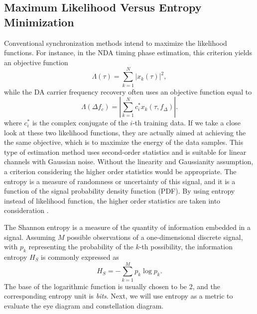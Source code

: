 \documentclass[journal,comsoc]{IEEEtran}
\begin{document}
\subsection{Maximum Likelihood Versus Entropy Minimization}
Conventional synchronization methods intend to maximize the likelihood functions.
For instance, in the NDA timing phase estimation, this criterion yields an objective function
\begin{equation}
\Lambda(\tau) =\sum\limits_{k = 1}^N {{{\left| {{x_k}( \tau )} \right|}^2}}, 
\end{equation}
while the DA carrier frequency recovery often uses an objective function equal to
\begin{equation}
\Lambda ({\Delta f_c })=\left| \sum\limits_{k = 1}^N {{{{c_i^*{x_k}(\tau ,{f_\Delta })}}}} \right|. 
\end{equation}
where \(c_i^*\) is the complex conjugate of the \(i\)-th training data.
If we take a close look at these two likelihood functions, they are actually aimed at achieving the the same objective, which is to maximize the energy of the data samples.
This type of estimation method uses second-order statistics and is suitable for linear channels with Gaussian noise.
Without the linearity and Gaussianity assumption, a criterion considering the higher order statistics would be appropriate.
The entropy is a measure of randomness or uncertainty of this signal, and it is a function of the signal probability density function (PDF).
By using entropy instead of likelihood function, the higher order statistics are taken into consideration \cite{Santamaria2002}.

The Shannon entropy is a measure of the quantity of information  embedded in a signal.
Assuming \(M\) possible observations of a one-dimensional discrete signal, with \(p_k\) representing the probability of the \(k\)-th possibility, the information entropy \(H_S\) is commonly expressed as \cite{Shannon1948}
\begin{equation}
H_S =  - \sum\limits_{k = 1}^M {{p_k}\log {p_k}}.
\label{eq:entropy}
\end{equation}
The base of the logarithmic function is usually chosen to be 2, and the corresponding entropy unit is \textit{bits}.
Next, we will use entropy as a metric to evaluate the eye diagram and constellation diagram.
\end{document}

